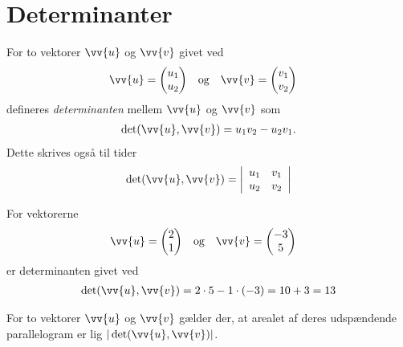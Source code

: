 \section*{Determinanter}

\begin{defn}[Determinanter]
	For to vektorer $\vv{u}$ og $\vv{v}$ givet ved
	\begin{align*}
		&\vv{u} =
		\begin{pmatrix}
			u_1 \\ u_2
		\end{pmatrix}& &\textnormal{og} &
		&\vv{v} = 
		\begin{pmatrix}
			v_1 \\ v_2
		\end{pmatrix}
	\end{align*}
	 defineres \textit{determinanten} mellem $\vv{u}$ og $\vv{v}$ som
	\begin{align*}
		\det(\vv{u},\vv{v}) = u_1v_2 - u_2v_1.
	\end{align*}
	Dette skrives også til tider
	\begin{align*}
		\det(\vv{u},\vv{v}) = 
		\left|
		\begin{array}{cc}
			u_1 & v_1 \\
			u_2 & v_2
		\end{array}
		\right|
	\end{align*}
\end{defn}

\begin{exa}
	For vektorerne
	\begin{align*}
		&\vv{u} =
		\begin{pmatrix}
			2 \\ 1
		\end{pmatrix}& &\textnormal{og} &
		&\vv{v} = 
		\begin{pmatrix}
			-3 \\ 5
		\end{pmatrix}
	\end{align*}	 
	er determinanten givet ved
	\begin{align*}
		\det(\vv{u},\vv{v}) = 2\cdot 5 - 1\cdot(-3) = 10+3 = 13
	\end{align*}
\end{exa}

\begin{setn}
	For to vektorer $\vv{u}$ og $\vv{v}$ gælder der, at arealet af deres 
	udspændende parallelogram er lig $|\det(\vv{u},\vv{v})|$.
\end{setn}

